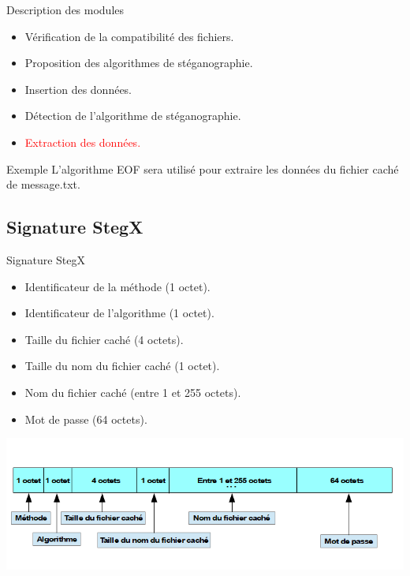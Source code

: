 \documentclass{beamer}
\begin{document}
  \begin{frame} %
	\begin{block}{Description des modules}
	\begin{itemize}
	[circle]
	\item Vérification de la compatibilité des fichiers.
	\item Proposition des algorithmes de stéganographie.
	\item Insertion des données.
	\item Détection de l'algorithme de stéganographie.
	\item \textcolor{red}{Extraction des données.}
	\end{itemize}
	\end{block}
	
	\begin{exampleblock}{Exemple} 
	L'algorithme EOF sera utilisé pour extraire les  données du fichier 
	caché de message.txt. 
	\end{exampleblock}
  \end{frame}
  	

  
  \subsection{Signature StegX}
  
  \begin{frame}
  
  \begin{block}{Signature StegX}
	\begin{itemize}
	[circle]
	\item Identificateur de la méthode (1 octet).
	\item Identificateur de l'algorithme (1 octet). 
	\item Taille du fichier caché (4 octets). 
	\item Taille du nom du fichier caché (1 octet). 
	\item Nom du fichier caché (entre 1 et 255 octets). 
	\item Mot de passe (64 octets).  
	\end{itemize}
	\end{block}
  
  \includegraphics[scale=0.55]{pictures/signature_6.png}
  \end{frame}
\end{document}
